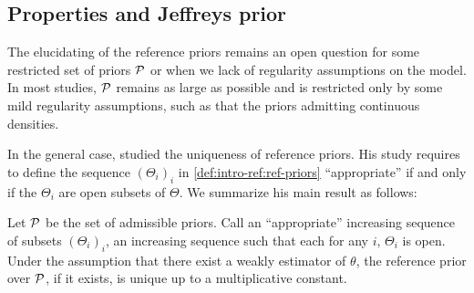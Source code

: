 \subsection{Properties and Jeffreys prior}\label{sec:intro-ref:properties}







The elucidating of the reference priors remains an open question for some restricted set of priors $\mathcal{P}$ or when we lack of regularity assumptions on the model.
In most studies, $\mathcal{P}$ remains as large as possible and is restricted only by some mild regularity assumptions, such as that the priors admitting continuous densities.
    









In the general case, \citet{mure_objective_2018} studied the uniqueness of reference priors. 
His study requires to define the sequence $(\Theta_i)_i$ in \cref{def:intro-ref:ref-priors} ``appropriate'' if and only if the $\Theta_i$ are open subsets of $\Theta$.
%
We summarize his main result as follows:
\begin{thm}
    Let $\mathcal{P}$ be the set of admissible priors. 
    Call an ``appropriate'' increasing sequence of subsets $(\Theta_i)_i$, an increasing sequence such that each for any $i$, $\Theta_i$ is open.
    Under the assumption that there exist a weakly estimator of $\theta$, the reference prior over $\mathcal{P}$, if it exists, is unique up to a multiplicative constant.
\end{thm}

